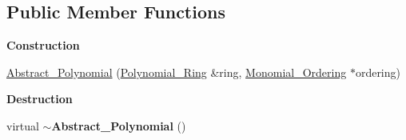 \subsection*{Public Member Functions}
\begin{Indent}\textbf{ Construction}\par
\begin{DoxyCompactItemize}
\item 
\hyperlink{class_abstract___polynomial_a01ef6bad0c81aeefb11252e86de91362}{Abstract\+\_\+\+Polynomial} (\hyperlink{class_polynomial___ring}{Polynomial\+\_\+\+Ring} \&ring, \hyperlink{class_monomial___ordering}{Monomial\+\_\+\+Ordering} $\ast$ordering)
\end{DoxyCompactItemize}
\end{Indent}
\begin{Indent}\textbf{ Destruction}\par
\begin{DoxyCompactItemize}
\item 
\mbox{\label{class_abstract___polynomial_a5082a214ab62d3d5aad6d294926be8e2}} 
virtual {\bfseries $\sim$\+Abstract\+\_\+\+Polynomial} ()
\end{DoxyCompactItemize}
\end{Indent}
